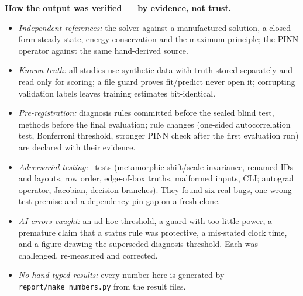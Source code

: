 \documentclass[10pt]{article}
\begin{document}
\textbf{How the output was verified --- by evidence, not trust.}
\begin{itemize}
\item \emph{Independent references:} the solver against a manufactured solution, a closed-form steady
state, energy conservation and the maximum principle; the PINN operator against the same hand-derived source.
\item \emph{Known truth:} all studies use synthetic data with truth stored separately and read only for
scoring; a file guard proves fit/predict never open it; corrupting validation labels leaves training
estimates bit-identical.
\item \emph{Pre-registration:} diagnosis rules committed before the sealed blind test, methods before the
final evaluation; rule changes (one-sided autocorrelation test, Bonferroni threshold, stronger PINN check
after the first evaluation run) are declared with their evidence.
\item \emph{Adversarial testing:} \NTests\ tests (metamorphic shift/scale invariance, renamed IDs and layouts,
row order, edge-of-box truths, malformed inputs, CLI; autograd operator, Jacobian, decision branches). They
found six real bugs, one wrong test premise and a dependency-pin gap on a fresh clone.
\item \emph{AI errors caught:} an ad-hoc threshold, a guard with too little power, a premature claim that a
status rule was protective, a mis-stated clock time, and a figure drawing the superseded diagnosis
threshold. Each was challenged, re-measured and corrected.
\item \emph{No hand-typed results:} every number here is generated by \texttt{report/make\_numbers.py}
from the result files.
\end{itemize}
\end{document}
